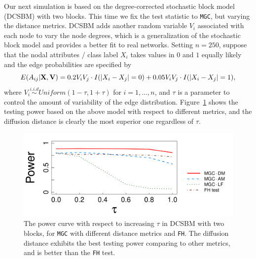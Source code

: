 \documentclass[11pt]{article}
\theoremstyle{definition}
\begin{document}
Our next simulation is based on the degree-corrected stochastic block model (DCSBM) with two blocks. This time we fix the test statistic to \texttt{MGC}, but varying the distance metrics. DCSBM adds another random variable $V_{i}$ associated with each node to vary the node degrees, which is a generalization of the stochastic block model and provides a better fit to real networks. Setting $n=250$, suppose that the nodal attributes / class label $X_i$ takes values in $0$ and $1$ equally likely and the edge probabilities are specified by 
\vspace*{-0.4cm}
\begin{equation}
E( A_{ij} | \mathbf{X}, \mathbf{V} )  = 0.2 V_{i} V_{j} \cdot I ( |X_{i} - X_{j}| = 0 ) + 0.05 V_{i} V_{j} \cdot I(|X_{i} - X_{j}| = 1),
\label{eq:tau}
\vspace*{-0.4cm}
\end{equation} 
where $V_{i} \overset{i.i.d}{\sim} Uniform(1 - \tau, 1 + \tau)$ for $i = 1, \ldots, n$, and $\tau$ is a parameter to control the amount of variability of the edge distribution. Figure~\ref{fig:dcSBM} shows the testing power based on the above model with respect to different metrics, and the diffusion distance is clearly the most superior one regardless of $\tau$.

\begin{figure}[ht]
	\centering
	\includegraphics[width=0.7\linewidth]{tau_short.pdf}
	\caption{The power curve with respect to increasing $\tau$ in DCSBM with two blocks, for \texttt{MGC} with different distance metrics and \texttt{FH}. The diffusion distance exhibits the best testing power comparing to other metrics, and is better than the \texttt{FH} test.}
	\label{fig:dcSBM}
	\vspace*{-0.5cm}
\end{figure}
\end{document}
